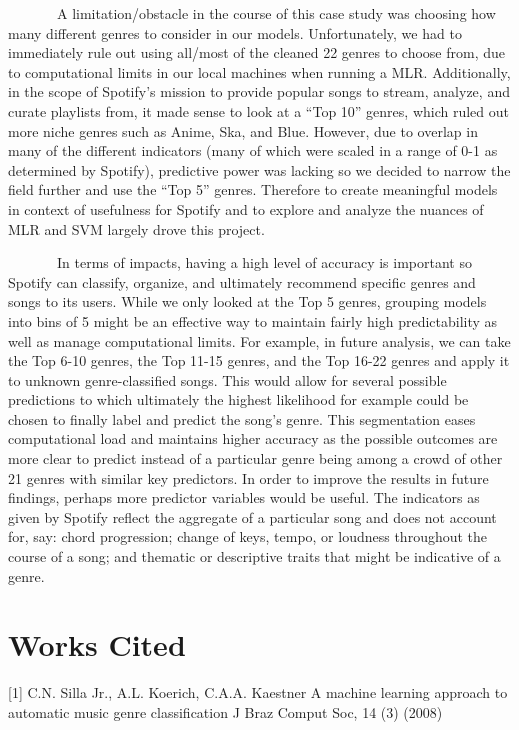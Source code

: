 \documentclass[
]{article}
\begin{document}
~~~~~~~A limitation/obstacle in the course of this case study was
choosing how many different genres to consider in our models.
Unfortunately, we had to immediately rule out using all/most of the
cleaned 22 genres to choose from, due to computational limits in our
local machines when running a MLR. Additionally, in the scope of
Spotify's mission to provide popular songs to stream, analyze, and
curate playlists from, it made sense to look at a ``Top 10'' genres,
which ruled out more niche genres such as Anime, Ska, and Blue. However,
due to overlap in many of the different indicators (many of which were
scaled in a range of 0-1 as determined by Spotify), predictive power was
lacking so we decided to narrow the field further and use the ``Top 5''
genres. Therefore to create meaningful models in context of usefulness
for Spotify and to explore and analyze the nuances of MLR and SVM
largely drove this project.

~~~~~~~In terms of impacts, having a high level of accuracy is important
so Spotify can classify, organize, and ultimately recommend specific
genres and songs to its users. While we only looked at the Top 5 genres,
grouping models into bins of 5 might be an effective way to maintain
fairly high predictability as well as manage computational limits. For
example, in future analysis, we can take the Top 6-10 genres, the Top
11-15 genres, and the Top 16-22 genres and apply it to unknown
genre-classified songs. This would allow for several possible
predictions to which ultimately the highest likelihood for example could
be chosen to finally label and predict the song's genre. This
segmentation eases computational load and maintains higher accuracy as
the possible outcomes are more clear to predict instead of a particular
genre being among a crowd of other 21 genres with similar key
predictors. In order to improve the results in future findings, perhaps
more predictor variables would be useful. The indicators as given by
Spotify reflect the aggregate of a particular song and does not account
for, say: chord progression; change of keys, tempo, or loudness
throughout the course of a song; and thematic or descriptive traits that
might be indicative of a genre.

\hypertarget{works-cited}{%
\section{Works Cited}\label{works-cited}}

{[}1{]} C.N. Silla Jr., A.L. Koerich, C.A.A. Kaestner A machine learning
approach to automatic music genre classification J Braz Comput Soc, 14
(3) (2008)
\end{document}
